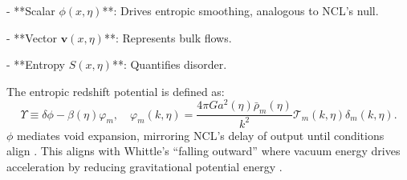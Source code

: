 \documentclass{article}
\begin{document}
- **Scalar \(\phi(x,\eta)\)**: Drives entropic smoothing, analogous to NCL's null.

- **Vector \(\mathbf{v}(x,\eta)\)**: Represents bulk flows.

- **Entropy \(S(x,\eta)\)**: Quantifies disorder.

The entropic redshift potential is defined as:
\[
\Upsilon \equiv \delta\phi - \beta(\eta)\varphi_m, \quad \varphi_m(k,\eta) = \frac{4\pi G a^2(\eta) \bar{\rho}_m(\eta)}{k^2} \mathcal{T}_m(k,\eta) \delta_m(k,\eta).
\]
\(\phi\) mediates void expansion, mirroring NCL's delay of output until conditions align \citep{einstein1917, desitter1917}. This aligns with Whittle's ``falling outward'' where vacuum energy drives acceleration by reducing gravitational potential energy \citep{whittle2006, whittle2015, peebles2003}.
\end{document}
